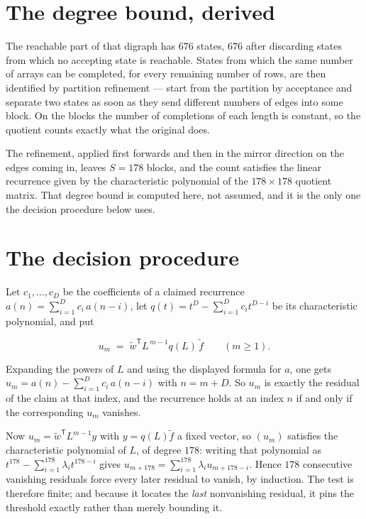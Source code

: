 \documentclass[11pt]{article}
\theoremstyle{definition}
\begin{document}
\section{The degree bound, derived}

The reachable part of that digraph has $676$ states, $676$ after discarding states from which no accepting state is reachable. States from which the same number of arrays can be completed, for every remaining number of rows, are then identified by partition refinement --- start from the partition by acceptance and separate two states as soon as they send different numbers of edges into some block. On the blocks the number of completions of each length is constant, so the quotient counts exactly what the original does.

The refinement, applied first forwards and then in the mirror direction on the edges coming in, leaves $S = 178$ blocks, and the count satisfies the linear recurrence given by the characteristic polynomial of the $178 \times 178$ quotient matrix. That degree bound is computed here, not assumed, and it is the only one the decision procedure below uses.

\section{The decision procedure}

Let $c_1,\dots,c_D$ be the coefficients of a claimed recurrence $a(n) = \sum_{i=1}^{D} c_i\,a(n-i)$, let $q(t) = t^{D} - \sum_{i=1}^{D} c_i t^{D-i}$ be its characteristic polynomial, and put

\[u_m \;=\; \tilde w^{\mathsf T} L^{\,m-1} q(L)\,\tilde f \qquad (m \ge 1).\]

Expanding the powers of $L$ and using the displayed formula for $a$, one gets $u_m = a(n) - \sum_{i=1}^{D} c_i\,a(n-i)$ with $n = m + D$. So $u_m$ is exactly the residual of the claim at that index, and the recurrence holds at an index $n$ if and only if the corresponding $u_m$ vanishes.

Now $u_m = \tilde w^{\mathsf T} L^{m-1} y$ with $y = q(L)\tilde f$ a fixed vector, so $(u_m)$ satisfies the characteristic polynomial of $L$, of degree $178$: writing that polynomial as $t^{178} - \sum_{i=1}^{178} \lambda_i t^{178-i}$ gives $u_{m+178} = \sum_{i=1}^{178} \lambda_i u_{m+178-i}$. Hence $178$ consecutive vanishing residuals force every later residual to vanish, by induction. The test is therefore finite; and because it locates the {\itshape last} nonvanishing residual, it pins the threshold exactly rather than merely bounding it.
\end{document}
